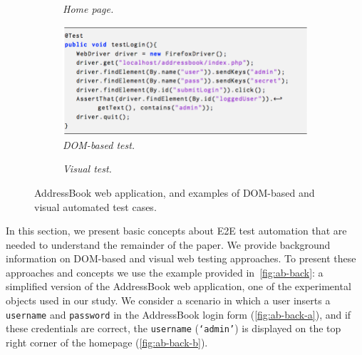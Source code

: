 \begin{figure}[t]
\begin{subfigure}{.25\linewidth}
\caption{\emph{Home page.}}
\label{fig:ab-back-b} 
\end{subfigure}
\qquad
\begin{subfigure}{.25\linewidth}
\centering
\includegraphics[trim=0cm 0cm 2cm 0cm, clip=true, scale=0.22]{images/test.png}
\caption{\emph{DOM-based test.}}
\label{fig:ab-back-c} 
\end{subfigure}
\quad
\begin{subfigure}{.20\linewidth}
\centering
{}
\caption{\emph{Visual test.}}
\label{fig:ab-back-d} 
\end{subfigure}
\caption{AddressBook web application, and examples of DOM-based and visual automated test cases. }
\label{fig:ab-back}
\end{figure}

In this section, we present basic concepts
about E2E test automation that are needed 
to understand the remainder of the paper.
We provide background information on 
DOM-based and visual web testing approaches.
To present these approaches and concepts
we use the example provided in~\autoref{fig:ab-back}: 
a simplified version of the AddressBook web application, 
one of the experimental objects used in our study. 
We consider a scenario in which a user 
inserts a \texttt{username} and \texttt{password} 
in the AddressBook login form 
(\autoref{fig:ab-back-a}), 
and if these credentials are correct, 
the \texttt{username} (\texttt{`admin'}) is displayed on the top right corner of the homepage 
(\autoref{fig:ab-back-b}).

